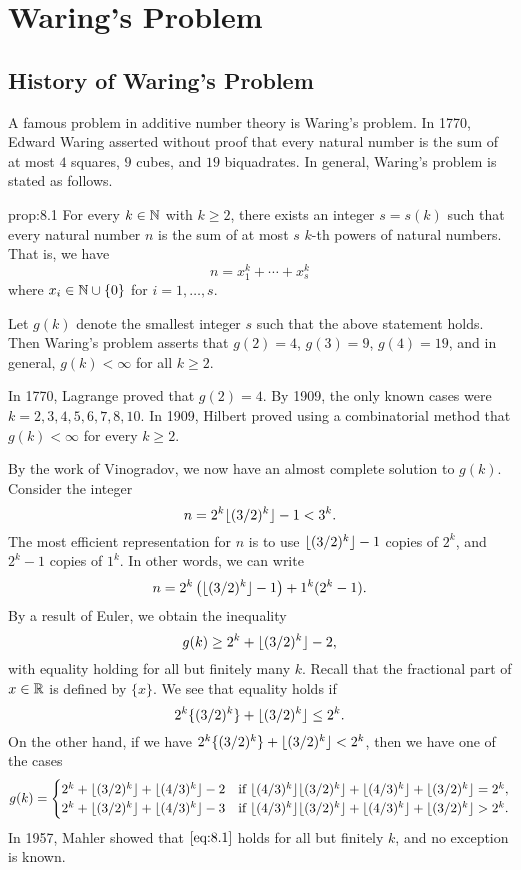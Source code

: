 \section{Waring's Problem}\label{sec:8}

\subsection{History of Waring's Problem}\label{subsec:8.1}
A famous problem in additive number theory is Waring's problem. In 1770, 
Edward Waring asserted without proof that every natural number is the sum 
of at most $4$ squares, $9$ cubes, and $19$ biquadrates. In general, 
Waring's problem is stated as follows. 

\begin{prop}{prop:8.1}
    For every $k \in \mathbb{N}$ with $k \geq 2$, there exists an integer $s = s(k)$ 
    such that every natural number $n$ is the sum of at most $s$ 
    $k$-th powers of natural numbers. That is, we have 
    \[ n = x_1^k + \cdots + x_s^k \] 
    where $x_i \in \mathbb{N} \cup \{0\}$ for $i = 1, \dots, s$. 
\end{prop}

Let $g(k)$ denote the smallest integer $s$ such that the above statement holds. 
Then Waring's problem asserts that $g(2) = 4$, $g(3) = 9$, $g(4) = 19$, 
and in general, $g(k) < \infty$ for all $k \geq 2$. 

In 1770, Lagrange proved that $g(2) = 4$. By 1909, the only known cases were 
$k = 2, 3, 4, 5, 6, 7, 8, 10$. In 1909, Hilbert proved using a combinatorial 
method that $g(k) < \infty$ for every $k \geq 2$. 

By the work of Vinogradov, we now have an almost complete solution to $g(k)$. 
Consider the integer 
\[ n = 2^k \lfloor(3/2)^k\rfloor - 1 < 3^k. \] 
The most efficient representation for $n$ is to use $\lfloor(3/2)^k\rfloor - 1$ 
copies of $2^k$, and $2^k - 1$ copies of $1^k$. In other words, we can write 
\[ n = 2^k \left( \lfloor(3/2)^k\rfloor - 1 \right) + 1^k (2^k - 1). \] 
By a result of Euler, we obtain the inequality
\[ g(k) \geq 2^k + \lfloor(3/2)^k\rfloor - 2, \] 
with equality holding for all but finitely many $k$. Recall that the 
fractional part of $x \in \mathbb{R}$ is defined by $\{x\}$. We see that 
equality holds if 
\begin{equation}\label{eq:8.1}
    2^k\{(3/2)^k\} + \lfloor(3/2)^k\rfloor \leq 2^k. 
\end{equation}
On the other hand, if we have $2^k\{(3/2)^k\} + \lfloor(3/2)^k\rfloor < 2^k$, then 
we have one of the cases 
\begin{align*}
    g(k) = \begin{cases}
        2^k + \lfloor(3/2)^k\rfloor + \lfloor(4/3)^k\rfloor - 2 & \text{if } \lfloor(4/3)^k\rfloor\lfloor(3/2)^k\rfloor + \lfloor(4/3)^k\rfloor + \lfloor(3/2)^k\rfloor = 2^k, \\ 
        2^k + \lfloor(3/2)^k\rfloor + \lfloor(4/3)^k\rfloor - 3 & \text{if } \lfloor(4/3)^k\rfloor\lfloor(3/2)^k\rfloor + \lfloor(4/3)^k\rfloor + \lfloor(3/2)^k\rfloor > 2^k.
    \end{cases} 
\end{align*}
In 1957, Mahler showed that $\eqref{eq:8.1}$ holds for all but finitely $k$, 
and no exception is known. 

